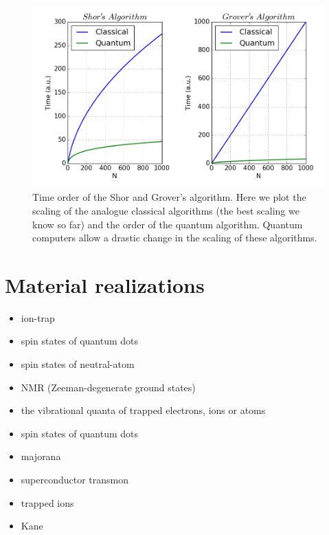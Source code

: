 \begin{figure}[!h]
  \centering
  \includegraphics{chapter01/figures/quantum_scaling.png}
  \vspace{-5pt}
  \caption{Time order of the Shor and Grover's algorithm. Here we plot the scaling of the analogue classical algorithms (the best scaling we know so far) and the order of the quantum algorithm. Quantum computers allow a drastic change in the scaling of these algorithms.}
\end{figure}
\FloatBarrier


\section{Material realizations}
\begin{itemize}
  \item ion-trap
  \item spin states of quantum dots
  \item spin states of neutral-atom
  \item NMR (Zeeman-degenerate ground states)
  \item the vibrational quanta of trapped electrons, ions or atoms
  \item spin states of quantum dots
  \item majorana
  \item superconductor transmon
  \item trapped ions
  \item Kane
\end{itemize}
